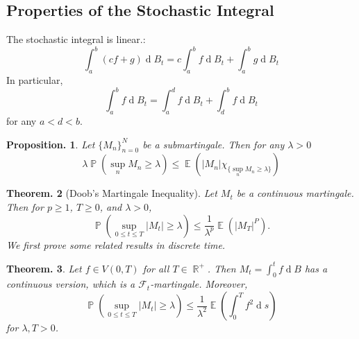 \documentclass[11pt, a4paper]{memoir}
\DeclareMathOperator{\R}{{\mathbb{R}}}
\theoremstyle{change}
\newtheorem{theorem}{Theorem.}[section]
\newtheorem{proposition}[theorem]{Proposition.}
\theoremstyle{plain}
\theoremstyle{nonumberplain}
\DeclareMathOperator{\pr}{{\mathbb{P}}}
\DeclareMathOperator{\E}{{\mathbb{E}}}
\renewcommand{\d}[1]{\ensuremath{\operatorname{d}\!{#1}}}
\numberwithin{equation}{section}
\begin{document}
\subsection{Properties of the Stochastic Integral}
The stochastic integral is linear.:
\begin{equation*}
    \int_a^b(cf+g)\d{B_t} = c\int_a^b f\d{B_t}+\int_a^b g\d{B_t}
\end{equation*}
In particular,
\begin{equation*}
    \int_a^b f\d{B_t}=\int_a^df\d{B_t}+\int_d^bf\d{B_t}
\end{equation*}
for any $a<d<b$.
\begin{proposition}
    Let $\{M_n\}_{n=0}^N$ be a submartingale.
    Then for any $\lambda>0$
    \begin{equation*}
        \lambda\pr(\sup_n M_n\geq\lambda)\leq\E(|M_n|\chi_{\{\sup_n M_n\geq\lambda\}})
    \end{equation*}
\end{proposition}
\begin{theorem}[Doob's Martingale Inequality]
    Let $M_t$ be a continuous martingale.
    Then for $p\geq 1$, $T\geq 0$, and $\lambda>0$,
    \begin{equation*}
        \pr(\sup_{0\leq t\leq T}|M_t|\geq\lambda)\leq\frac{1}{\lambda^p}\E(|M_T|^P).
    \end{equation*}
    We first prove some related results in discrete time.
\end{theorem}
\begin{theorem}
    Let $f\in V(0,T)$ for all $T\in\R^+$.
    Then $M_t=\int_0^tf\d{B}$ has a continuous version, which is a $\mathcal{F}_t$-martingale.
    Moreover,
    \begin{equation*}
        \pr\left(\sup_{0\leq t\leq T}|M_t|\geq\lambda\right)\leq\frac{1}{\lambda^2}\E(\int_0^Tf^2\d{s})
    \end{equation*}
    for $\lambda,T>0$.
\end{theorem}
\end{document}
